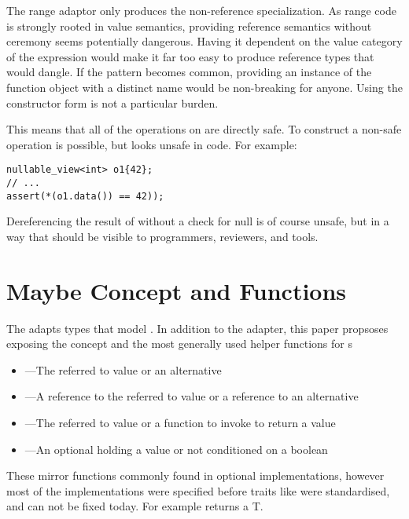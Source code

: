 \documentclass[a4paper,10pt,oneside,openany,final,article]{memoir}
\begin{document}
The range adaptor  only produces the non-reference specialization. As range code is strongly rooted in value semantics, providing reference semantics without ceremony seems potentially dangerous. Having it dependent on the value category of the expression would make it far too easy to produce reference types that would dangle. If the pattern becomes common, providing an instance of the function object with a distinct name would be non-breaking for anyone. Using the constructor form is not a particular burden.

This means that all of the operations on  are directly safe. To construct a non-safe operation is possible, but looks unsafe in code. For example:

\begin{minipage}[t]{\columnwidth}
  \begin{verbatim}
nullable_view<int> o1{42};
// ...
assert(*(o1.data()) == 42));
  \end{verbatim}
\end{minipage}

Dereferencing the result of  without a check for null is of course unsafe, but in a way that should be visible to programmers, reviewers,  and tools.

\chapter{Maybe Concept and Functions}
The  adapts types that model . In addition to the adapter, this paper propsoses exposing the concept and the most generally used helper functions for s
\begin{itemize}
\item {}---The referred to value or an alternative
\item {}---A reference to the referred to value or a reference to an alternative
\item {}---The referred to value or a function to invoke to return a value
\item {}---An optional holding a value or not conditioned on a boolean
\end{itemize}

These mirror functions commonly found in optional implementations, however most of the implementations were specified before traits like  were standardised, and can not be fixed today. For example  returns a T.
\end{document}
